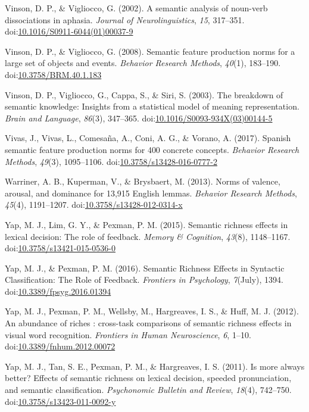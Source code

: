 \documentclass[english,,man]{apa6}
\begin{document}
\leavevmode\hypertarget{ref-Vinson2002}{}%
Vinson, D. P., \& Vigliocco, G. (2002). A semantic analysis of noun-verb dissociations in aphasia. \emph{Journal of Neurolinguistics}, \emph{15}, 317--351. doi:\href{https://doi.org/10.1016/S0911-6044(01)00037-9}{10.1016/S0911-6044(01)00037-9}

\leavevmode\hypertarget{ref-Vinson2008}{}%
Vinson, D. P., \& Vigliocco, G. (2008). Semantic feature production norms for a large set of objects and events. \emph{Behavior Research Methods}, \emph{40}(1), 183--190. doi:\href{https://doi.org/10.3758/BRM.40.1.183}{10.3758/BRM.40.1.183}

\leavevmode\hypertarget{ref-Vinson2003}{}%
Vinson, D. P., Vigliocco, G., Cappa, S., \& Siri, S. (2003). The breakdown of semantic knowledge: Insights from a statistical model of meaning representation. \emph{Brain and Language}, \emph{86}(3), 347--365. doi:\href{https://doi.org/10.1016/S0093-934X(03)00144-5}{10.1016/S0093-934X(03)00144-5}

\leavevmode\hypertarget{ref-Vivas2017}{}%
Vivas, J., Vivas, L., Comesaña, A., Coni, A. G., \& Vorano, A. (2017). Spanish semantic feature production norms for 400 concrete concepts. \emph{Behavior Research Methods}, \emph{49}(3), 1095--1106. doi:\href{https://doi.org/10.3758/s13428-016-0777-2}{10.3758/s13428-016-0777-2}

\leavevmode\hypertarget{ref-Warriner2013}{}%
Warriner, A. B., Kuperman, V., \& Brysbaert, M. (2013). Norms of valence, arousal, and dominance for 13,915 English lemmas. \emph{Behavior Research Methods}, \emph{45}(4), 1191--1207. doi:\href{https://doi.org/10.3758/s13428-012-0314-x}{10.3758/s13428-012-0314-x}

\leavevmode\hypertarget{ref-Yap2015}{}%
Yap, M. J., Lim, G. Y., \& Pexman, P. M. (2015). Semantic richness effects in lexical decision: The role of feedback. \emph{Memory \& Cognition}, \emph{43}(8), 1148--1167. doi:\href{https://doi.org/10.3758/s13421-015-0536-0}{10.3758/s13421-015-0536-0}

\leavevmode\hypertarget{ref-Yap2016}{}%
Yap, M. J., \& Pexman, P. M. (2016). Semantic Richness Effects in Syntactic Classification: The Role of Feedback. \emph{Frontiers in Psychology}, \emph{7}(July), 1394. doi:\href{https://doi.org/10.3389/fpsyg.2016.01394}{10.3389/fpsyg.2016.01394}

\leavevmode\hypertarget{ref-Yap2012}{}%
Yap, M. J., Pexman, P. M., Wellsby, M., Hargreaves, I. S., \& Huff, M. J. (2012). An abundance of riches : cross-task comparisons of semantic richness effects in visual word recognition. \emph{Frontiers in Human Neuroscience}, \emph{6}, 1--10. doi:\href{https://doi.org/10.3389/fnhum.2012.00072}{10.3389/fnhum.2012.00072}

\leavevmode\hypertarget{ref-Yap2011}{}%
Yap, M. J., Tan, S. E., Pexman, P. M., \& Hargreaves, I. S. (2011). Is more always better? Effects of semantic richness on lexical decision, speeded pronunciation, and semantic classification. \emph{Psychonomic Bulletin and Review}, \emph{18}(4), 742--750. doi:\href{https://doi.org/10.3758/s13423-011-0092-y}{10.3758/s13423-011-0092-y}
\end{document}
